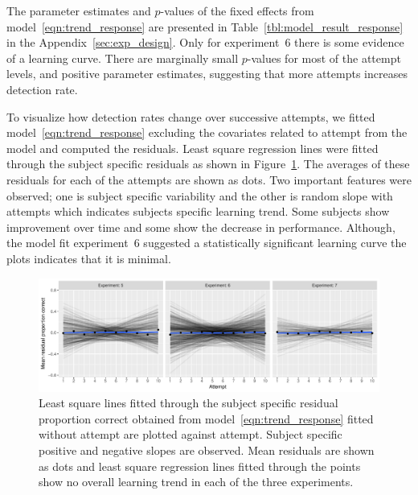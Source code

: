 \documentclass[10pt]{article}\usepackage[]{graphicx}\usepackage[]{xcolor}
\begin{document}
The parameter estimates and $p$-values of the fixed effects from model~\eqref{eqn:trend_response} are presented in Table~\ref{tbl:model_result_response} in the Appendix~\ref{sec:exp_design}. Only for experiment~6 there is some evidence of a learning curve. There are marginally small $p$-values for most of the attempt levels, and positive parameter estimates, suggesting that more attempts increases detection rate. 


To visualize how  detection rates change over successive attempts, we fitted model~\eqref{eqn:trend_response} excluding the covariates related to attempt from the model and computed the residuals. Least square regression lines were fitted through the subject specific residuals as shown in Figure~\ref{fig:learning_trend_response}. The averages of these residuals for each of the attempts are shown as dots. Two important features were observed; one is subject specific variability and the other is random slope with attempts which indicates subjects specific learning trend. Some subjects show improvement over time and some show the decrease in performance. Although, the model fit experiment~6 suggested a statistically significant learning curve the plots indicates that it is minimal. 

\begin{figure}[htbp] 
   \centering
    \includegraphics[width=6.3in]{learning_trend_subject.pdf} 
   \caption{ Least square lines fitted through the subject specific residual proportion correct obtained from model~\eqref{eqn:trend_response} fitted without attempt are plotted against attempt. Subject specific positive and negative slopes are observed. Mean residuals are shown as dots and least square regression lines fitted through the points show no overall learning trend in each of the three experiments.}
   \label{fig:learning_trend_response}
\end{figure}
\end{document}
